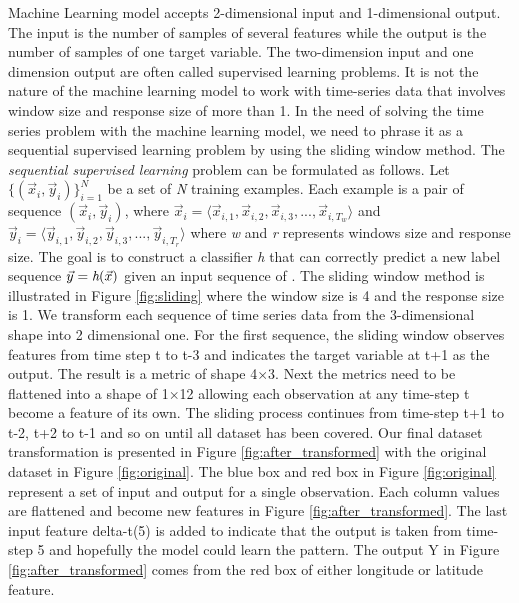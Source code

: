 Machine Learning model accepts 2-dimensional input and 1-dimensional output. The input is the number of samples of several features while the output is the number of samples of one target variable. The two-dimension input and one dimension output are often called supervised learning problems. It is not the nature of the machine learning model to work with time-series data that involves window size and response size of more than 1. In the need of solving the time series problem with the machine learning model, we need to phrase it as a sequential supervised learning problem by using the sliding window method. The \emph{sequential supervised learning} problem can be formulated as follows. Let $\{(\Vec{x}_i, \Vec{y}_i)\}_{i=1}^{N}$ be a set of \emph{N} training examples. Each example is a pair of sequence $(\Vec{x}_i, \Vec{y}_i)$, where $\Vec{x}_i = \langle \Vec{x}_{i,1}, \Vec{x}_{i,2}, \Vec{x}_{i,3}, ..., \Vec{x}_{i,T_w} \rangle$ and $\Vec{y}_i = \langle \Vec{y}_{i,1}, \Vec{y}_{i,2}, \Vec{y}_{i,3}, ..., \Vec{y}_{i,T_r} \rangle$ where \emph{w} and \emph{r} represents windows size and response size. The goal is to construct a classifier \emph{h} that can correctly predict a new label sequence $\Vec{y} = \emph{h}(\Vec{x})$ given an input sequence of  \cite{dietterich2002machine}. The sliding window method is illustrated in Figure \ref{fig:sliding} where the window size is 4 and the response size is 1. We transform each sequence of time series data from the 3-dimensional shape into 2 dimensional one. For the first sequence, the sliding window observes features from time step t to t-3 and indicates the target variable at t+1 as the output. The result is a metric of shape 4$\times$3. Next the metrics need to be flattened into a shape of 1$\times$12 allowing each observation at any time-step t become a feature of its own. The sliding process continues from time-step t+1 to t-2, t+2 to t-1 and so on until all dataset has been covered. Our final dataset transformation is presented in Figure \ref{fig:after_transformed} with the original dataset in Figure \ref{fig:original}. The blue box and red box in Figure \ref{fig:original} represent a set of input and output for a single observation. Each column values are flattened and become new features in Figure \ref{fig:after_transformed}. The last input feature delta-t(5) is added to indicate that the output is taken from time-step 5 and hopefully the model could learn the pattern. The output Y in Figure \ref{fig:after_transformed} comes from the red box of either longitude or latitude feature.


